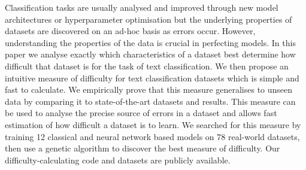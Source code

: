 Classification tasks are usually analysed and improved through new model architectures or hyperparameter optimisation but the underlying properties of datasets are discovered on an ad-hoc basis as errors occur. However, understanding the properties of the data is crucial in perfecting models. In this paper we analyse exactly which characteristics of a dataset best determine how difficult that dataset is for the task of text classification. We then propose an intuitive measure of difficulty for text classification datasets which is simple and fast to calculate. We empirically prove that this measure generalises to unseen data by comparing it to state-of-the-art datasets and results. This measure can be used to analyse the precise source of errors in a dataset and allows fast estimation of how difficult a dataset is to learn. We searched for this measure by training 12 classical and neural network based models on 78 real-world datasets, then use a genetic algorithm to discover the best measure of difficulty. Our difficulty-calculating code and datasets are publicly available.
